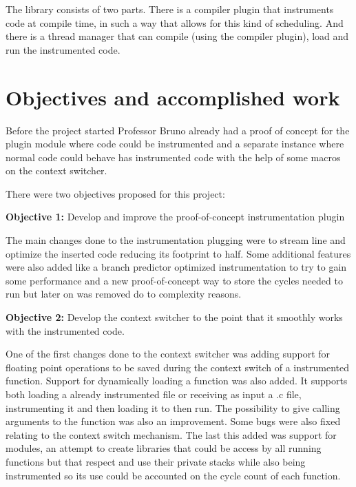 \documentclass[12pt,a4paper]{report}
\begin{document}

The library consists of two parts. There is a compiler plugin that instruments code at compile time, in such a way that allows for this kind of scheduling. And there is a thread manager that can compile (using the compiler plugin), load and run the instrumented code.

\section{Objectives and accomplished work}

Before the project started Professor Bruno already had a proof of concept for the plugin module where code could be instrumented and a separate instance where normal code could behave has instrumented code with the help of some macros on the context switcher.

There were two objectives proposed for this project:

\textbf{Objective 1:} Develop and improve the proof-of-concept instrumentation plugin

The main changes done to the instrumentation plugging were to stream line and optimize the inserted code reducing its footprint to half. Some additional features were also added like a branch predictor optimized instrumentation to try to gain some performance and a new proof-of-concept way to store the cycles needed to run but later on was removed do to complexity reasons.

\textbf{Objective 2:} Develop the context switcher to the point that it smoothly works with the instrumented code.

One of the first changes done to the context switcher was adding support for floating point operations to be saved during the context switch of a instrumented function.
Support for dynamically loading a function was also added. It supports both loading a already instrumented file or receiving as input a .c file, instrumenting it and then loading it to then run.
The possibility to give calling arguments to the function was also an improvement.
Some bugs were also fixed relating to the context switch mechanism.
The last this added was support for modules, an attempt to create libraries that could be access by all running functions but that respect and use their private stacks while also being instrumented so its use could be accounted on the cycle count of each function.  
\end{document}
